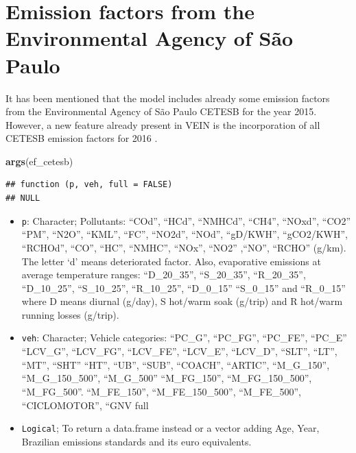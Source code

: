 \documentclass[12pt,graybox,envcountchap,sectrefs]{krantz}
\makeatletter
\newenvironment{Shaded}{\begin{snugshade}}{\end{snugshade}}
\newcommand{\KeywordTok}[1]{\textcolor[rgb]{0.13,0.29,0.53}{\textbf{#1}}}
\newcommand{\NormalTok}[1]{#1}
\providecommand{\tightlist}{%
  \setlength{\itemsep}{0pt}\setlength{\parskip}{0pt}}
\newenvironment{kframe}{%
\medskip{}
\setlength{\fboxsep}{.8em}
 \def\at@end@of@kframe{}%
 \ifinner\ifhmode%
  \def\at@end@of@kframe{\end{minipage}}%
  \begin{minipage}{\columnwidth}%
 \fi\fi%
 \def\FrameCommand##1{\hskip\@totalleftmargin \hskip-\fboxsep
 \colorbox{shadecolor}{##1}\hskip-\fboxsep
     \hskip-\linewidth \hskip-\@totalleftmargin \hskip\columnwidth}%
 \MakeFramed {\advance\hsize-\width
   \@totalleftmargin\z@ \linewidth\hsize
   \@setminipage}}%
 {\par\unskip\endMakeFramed%
 \at@end@of@kframe}
\renewenvironment{Shaded}{\begin{kframe}}{\end{kframe}}
\theoremstyle{definition}
\theoremstyle{definition}
\theoremstyle{definition}
\theoremstyle{remark}
\makeatother
\begin{document}
\section{Emission factors from the Environmental Agency of São
Paulo}\label{emission-factors-from-the-environmental-agency-of-sao-paulo}

It has been mentioned that the model includes already some emission
factors from the Environmental Agency of São Paulo CETESB for the year
2015. However, a new feature already present in VEIN is the
incorporation of all CETESB emission factors for 2016
\citep{CETESB2016}.

\begin{Shaded}
\begin{Highlighting}[]
\KeywordTok{args}\NormalTok{(ef_cetesb)}
\end{Highlighting}
\end{Shaded}

\begin{verbatim}
## function (p, veh, full = FALSE) 
## NULL
\end{verbatim}

\begin{itemize}
\tightlist
\item
  \texttt{p}: Character; Pollutants: ``COd'', ``HCd'', ``NMHCd'',
  ``CH4'', ``NOxd'', ``CO2'' ``PM'', ``N2O'', ``KML'', ``FC'', ``NO2d'',
  ``NOd'', ``gD/KWH'', ``gCO2/KWH'', ``RCHOd'', ``CO'', ``HC'',
  ``NMHC'', ``NOx'', ``NO2'' ,``NO'', ``RCHO'' (g/km). The letter `d'
  means deteriorated factor. Also, evaporative emissions at average
  temperature ranges: ``D\_20\_35'', ``S\_20\_35'', ``R\_20\_35'',
  ``D\_10\_25'', ``S\_10\_25'', ``R\_10\_25'', ``D\_0\_15'' ``S\_0\_15''
  and ``R\_0\_15'' where D means diurnal (g/day), S hot/warm soak
  (g/trip) and R hot/warm running losses (g/trip).
\item
  \texttt{veh}: Character; Vehicle categories: ``PC\_G'', ``PC\_FG'',
  ``PC\_FE'', ``PC\_E'' ``LCV\_G'', ``LCV\_FG'', ``LCV\_FE'',
  ``LCV\_E'', ``LCV\_D'', ``SLT'', ``LT'', ``MT'', ``SHT'' ``HT'',
  ``UB'', ``SUB'', ``COACH'', ``ARTIC'', ``M\_G\_150'',
  ``M\_G\_150\_500'', ``M\_G\_500'' ``M\_FG\_150'', ``M\_FG\_150\_500'',
  ``M\_FG\_500''. ``M\_FE\_150'', ``M\_FE\_150\_500'', ``M\_FE\_500'',
  ``CICLOMOTOR'', ``GNV full\\
\item
  \texttt{Logical}; To return a data.frame instead or a vector adding
  Age, Year, Brazilian emissions standards and its euro equivalents.
\end{itemize}
\end{document}
